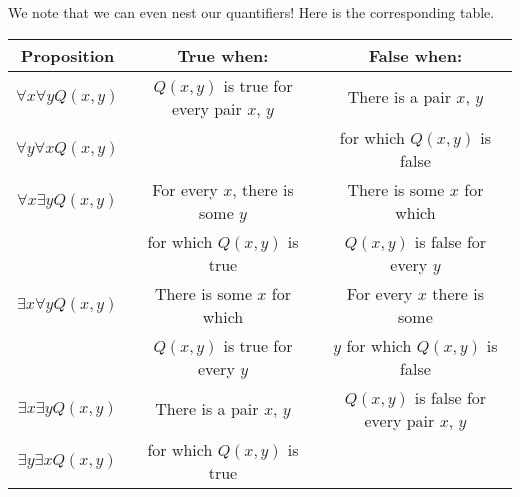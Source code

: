 \documentclass[../main.tex]{subfiles}
\begin{document}
We note that we can even nest our quantifiers! Here is the corresponding table.
\begin{center}
    \begin{tabular}{c|c|c}
    Proposition & True when: & False when: \\
    \hline
    $\forall x \forall y Q(x,y)$ & $Q(x, y)$ is true for every pair $x$, $y$ & There is a pair $x$, $y$  \\
    $\forall y \forall x Q(x,y)$ & & for which $Q(x, y)$ is false \\
    \hline
     $\forall x \exists y Q(x,y)$ & For every $x$, there is some $y$ & There is some $x$ for which \\
     & for which $Q(x, y)$ is true & $Q(x,y)$ is false for every $y$\\
     \hline
     $\exists x \forall y Q(x,y)$ & There is some $x$ for which & For every $x$ there is some \\
     & $Q(x,y)$ is true for every $y$ & $y$ for which $Q(x,y)$ is false\\
     \hline
     $\exists x \exists y Q(x,y)$ & There is a pair $x$, $y$ & $Q(x, y)$ is false for every pair $x$, $y$  \\
    $\exists y \exists x Q(x,y)$ &  for which $Q(x, y)$ is true & \\
    \end{tabular}
\end{center}
\end{document}
